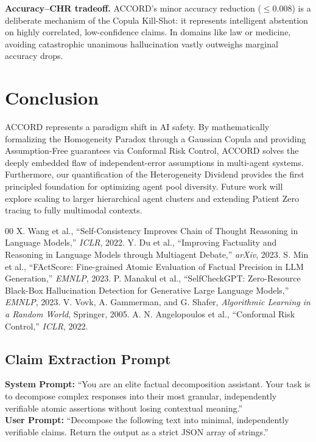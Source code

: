 \documentclass[conference]{IEEEtran}
\begin{document}
\textbf{Accuracy--CHR tradeoff.} ACCORD's minor accuracy reduction ($\leq$0.008) is a deliberate mechanism of the Copula Kill-Shot: it represents intelligent abstention on highly correlated, low-confidence claims. In domains like law or medicine, avoiding catastrophic unanimous hallucination vastly outweighs marginal accuracy drops.

\section{Conclusion}

ACCORD represents a paradigm shift in AI safety. By mathematically formalizing the Homogeneity Paradox through a Gaussian Copula and providing Assumption-Free guarantees via Conformal Risk Control, ACCORD solves the deeply embedded flaw of independent-error assumptions in multi-agent systems. Furthermore, our quantification of the Heterogeneity Dividend provides the first principled foundation for optimizing agent pool diversity. Future work will explore scaling to larger hierarchical agent clusters and extending Patient Zero tracing to fully multimodal contexts.


\begin{thebibliography}{00}
 X. Wang et al., ``Self-Consistency Improves Chain of Thought Reasoning in Language Models,'' \textit{ICLR}, 2022.
 Y. Du et al., ``Improving Factuality and Reasoning in Language Models through Multiagent Debate,'' \textit{arXiv}, 2023.
 S. Min et al., ``FActScore: Fine-grained Atomic Evaluation of Factual Precision in LLM Generation,'' \textit{EMNLP}, 2023.
 P. Manakul et al., ``SelfCheckGPT: Zero-Resource Black-Box Hallucination Detection for Generative Large Language Models,'' \textit{EMNLP}, 2023.
 V. Vovk, A. Gammerman, and G. Shafer, \textit{Algorithmic Learning in a Random World}, Springer, 2005.
 A. N. Angelopoulos et al., ``Conformal Risk Control,'' \textit{ICLR}, 2022.
\end{thebibliography}

\appendix

\subsection{Claim Extraction Prompt}
\label{app:prompt}
\textbf{System Prompt:} ``You are an elite factual decomposition assistant. Your task is to decompose complex responses into their most granular, independently verifiable atomic assertions without losing contextual meaning.''\\
\textbf{User Prompt:} ``Decompose the following text into minimal, independently verifiable claims. Return the output as a strict JSON array of strings.''
\end{document}
